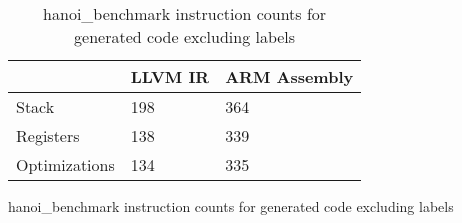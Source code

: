 \begin{table}[h!]
\centering
\begin{tabular}{p{}p{}p{}}
  \hline
 & LLVM IR & ARM Assembly \\ 
  \hline
Stack & 198 & 364 \\ 
  Registers & 138 & 339 \\ 
  Optimizations & 134 & 335 \\ 
   \hline
\end{tabular}
\caption{hanoi\_benchmark instruction counts for generated code excluding labels}
\caption{hanoi\_benchmark instruction counts for generated code excluding labels}
\end{table}
